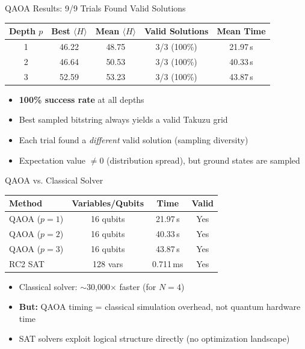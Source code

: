 \documentclass[aspectratio=169]{beamer}
\begin{document}
\begin{frame}{QAOA Results: 9/9 Trials Found Valid Solutions}

\begin{table}
\centering
\begin{tabular}{@{} ccccc @{}}
    \toprule
    Depth $p$ & Best $\langle H \rangle$ & Mean $\langle H \rangle$ & Valid Solutions & Mean Time \\
    \midrule
    1 & 46.22 & 48.75 & 3/3 (100\%) & 21.97\,s \\
    2 & 46.64 & 50.53 & 3/3 (100\%) & 40.33\,s \\
    3 & 52.59 & 53.23 & 3/3 (100\%) & 43.87\,s \\
    \bottomrule
\end{tabular}
\end{table}

\bigskip
\begin{itemize}
    \item \textbf{100\% success rate} at all depths
    \item Best sampled bitstring always yields a valid Takuzu grid
    \item Each trial found a \emph{different} valid solution (sampling diversity)
    \item Expectation value $\neq 0$ (distribution spread), but ground states are sampled
\end{itemize}
\end{frame}

\begin{frame}{QAOA vs. Classical Solver}

\begin{table}
\centering
\begin{tabular}{@{} lccc @{}}
    \toprule
    Method & Variables/Qubits & Time & Valid \\
    \midrule
    QAOA ($p=1$) & 16 qubits & 21.97\,s & Yes \\
    QAOA ($p=2$) & 16 qubits & 40.33\,s & Yes \\
    QAOA ($p=3$) & 16 qubits & 43.87\,s & Yes \\
    RC2 SAT & 128 vars & 0.711\,ms & Yes \\
    \bottomrule
\end{tabular}
\end{table}

\bigskip
\begin{itemize}
    \item Classical solver: $\sim$30,000$\times$ faster (for $N=4$)
    \item \textbf{But:} QAOA timing = classical simulation overhead, not quantum hardware time
    \item SAT solvers exploit logical structure directly (no optimization landscape)
\end{itemize}
\end{frame}
\end{document}
